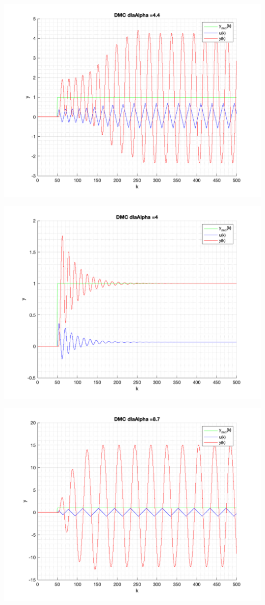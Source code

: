 \documentclass[a4paper, 11pt]{article}
\begin{document}
\begin{enumerate}
 \includegraphics[width=\linewidth]{./ModelsDodatkowe_Alpha/P4_DMC_Alpha_4_4_png.png} 
 
 \includegraphics[width=\linewidth]{./ModelsDodatkowe_Alpha/P4_DMC_Alpha_4_png.png} 
 
 \includegraphics[width=\linewidth]{./ModelsDodatkowe_Alpha/P4_DMC_Alpha_8_7_png.png} 
 

\end{enumerate}
\end{document}

